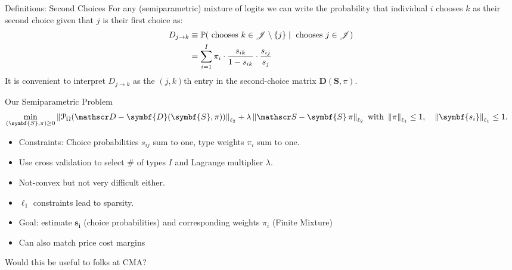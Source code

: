 \documentclass[aspectratio=169,10pt]{beamer}
\begin{document}
\begin{frame}{Definitions: Second Choices}
For any (semiparametric) mixture of logits we can write the probability that individual $i$ chooses $k$ as their \alert{second choice} given that $j$ is their first choice as:
\begin{align*}
D_{j \rightarrow k} & \equiv \mathbb{P}(\text{ chooses } k \in \mathscr{J} \setminus \{j\} \mid
\text{ chooses } j \in \mathscr{J} )\\
&= \sum_{i=1}^I \pi_i \cdot \frac{s_{ik}}{1-s_{ik}} \cdot \frac{s_{ij}}{s_j}
\end{align*}
It is convenient to interpret $D_{j \rightarrow k}$ as the $(j,k)$th entry in the second-choice matrix $\symbf{D}(\symbf{S},\pi)$.
\end{frame}




\begin{frame}{Our Semiparametric Problem}
\small
\begin{align*}
\min _{(\symbf{S}, \pi) \geq 0} \left\|\mathcal{P}_{\Omega}(\calD-\symbf{D}(\symbf{S},\pi))\right\|_{\ell_2}  &+ \lambda \left\|\calS- \symbf{S}\,\pi \right\|_{\ell_2} \text { with } \left\|\pi  \right\|_{\ell_1} \leq 1, \quad   \left\|\symbf{s_i}  \right\|_{\ell_1} \leq 1.
\end{align*}
\vspace{-.25cm}
\begin{itemize}
    \item Constraints: Choice probabilities $s_{ij}$ sum to one, type weights $\pi_i$ sum to one.
\item Use cross validation to select \# of types $I$ and Lagrange multiplier $\lambda$.
\item Not-convex but not very difficult either.
\item $\ell_1$ constraints lead to \alert{sparsity}.
\item Goal: estimate $\symbf{s_i}$ (choice probabilities) and corresponding weights $\pi_i$ (Finite Mixture)
\item Can also match \alert{price cost margins}
\end{itemize}
Would this be useful to folks at CMA?
\end{frame}
\end{document}
